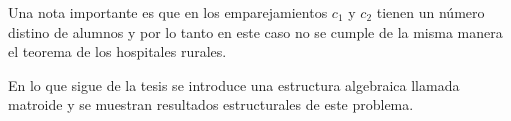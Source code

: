 Una nota importante es que en los emparejamientos $c_1$ y $c_2$ tienen un número distino de alumnos y por lo tanto en este caso no se cumple de la misma manera el teorema de los hospitales rurales. 

En lo que sigue de la tesis se introduce una estructura algebraica llamada matroide y se muestran resultados estructurales de este problema.



